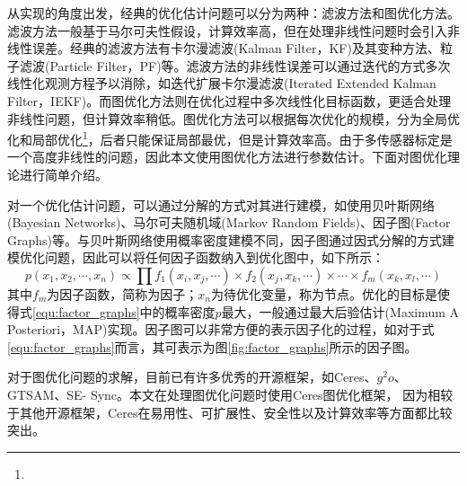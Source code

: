 从实现的角度出发，经典的优化估计问题可以分为两种：滤波方法和图优化方法。滤波方法一般基于马尔可夫性假设，计算效率高，但在处理非线性问题时会引入非线性误差。经典的滤波方法有卡尔漫滤波(Kalman Filter，KF)及其变种方法、粒子滤波(Particle Filter，PF)等。滤波方法的非线性误差可以通过迭代的方式多次线性化观测方程予以消除\cite{barfoot2017state}，如迭代扩展卡尔漫滤波(Iterated Extended Kalman Filter，IEKF)。而图优化方法则在优化过程中多次线性化目标函数，更适合处理非线性问题，但计算效率稍低。图优化方法可以根据每次优化的规模，分为全局优化和局部优化\footnote{}，后者只能保证局部最优，但是计算效率高。由于多传感器标定是一个高度非线性的问题，因此本文使用图优化方法进行参数估计。下面对图优化理论进行简单介绍。

对一个优化估计问题，可以通过分解的方式对其进行建模，如使用贝叶斯网络(Bayesian
Networks)、马尔可夫随机域(Markov Random Fields)、因子图(Factor Graphs)等。与贝叶斯网络使用概率密度建模不同，因子图通过因式分解的方式建模优化问题，因此可以将任何因子函数纳入到优化图中\cite{dellaert2017factor}，如下所示：
\begin{equation}
  \label{equ:factor_graphs}
  p(x_1,x_2,\cdots,x_n)\propto\prod f_1(x_i,x_j,\cdots)\times f_2(x_j,x_k,\cdots)\times\cdots\times f_m(x_k,x_l,\cdots)
\end{equation}
其中$f_m$为因子函数，简称为因子；$x_n$为待优化变量，称为节点。优化的目标是使得式\ref{equ:factor_graphs}中的概率密度$p$最大，一般通过最大后验估计(Maximum A Posteriori，MAP)实现。因子图可以非常方便的表示因子化的过程，如对于式\ref{equ:factor_graphs}而言，其可表示为图\ref{fig:factor_graphs}所示的因子图。

对于图优化问题的求解，目前已有许多优秀的开源框架，如Ceres\cite{agarwal2012ceres}、$g^2o$\cite{grisetti2011g2o}、GTSAM\cite{dellaert2012factor}、SE-
Sync\cite{rosen2020certifiably}。本文在处理图优化问题时使用Ceres图优化框架， 因为相较于其他开源框架，Ceres在易用性、可扩展性、安全性以及计算效率等方面都比较突出\cite{juric2021comparison}。
